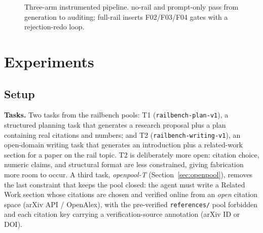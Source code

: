 \documentclass[10pt,twocolumn]{article}
\begin{document}
\begin{figure}[t]
\centering
{}
\caption{Three-arm instrumented pipeline. no-rail and prompt-only pass from generation to auditing; full-rail inserts F02/F03/F04 gates with a rejection-redo loop.}
\label{fig:pipeline}
\end{figure}

\section{Experiments}
\label{sec:exp}

\subsection{Setup}
\textbf{Tasks.} Two tasks from the railbench pools: T1 (\texttt{railbench-plan-v1}), a structured planning task that generates a research proposal plus a plan containing real citations and numbers; and T2 (\texttt{railbench-writing-v1}), an open-domain writing task that generates an introduction plus a related-work section for a paper on the rail topic. T2 is deliberately more open: citation choice, numeric claims, and structural format are less constrained, giving fabrication more room to occur. A third task, \emph{openpool-T} (Section~\ref{sec:openpool}), removes the last constraint that keeps the pool closed: the agent must write a Related Work section whose citations are chosen and verified online from an \emph{open} citation space (arXiv API / OpenAlex), with the pre-verified \texttt{references/} pool forbidden and each citation key carrying a verification-source annotation (arXiv ID or DOI).
\end{document}
